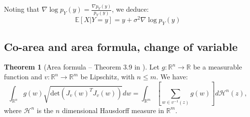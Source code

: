 \documentclass[a4paper,10pt]{article}
\theoremstyle{definition} %
\theoremstyle{definition} %
\theoremstyle{definition} %
\newtheorem{theorem}[definition]{Theorem}
\theoremstyle{definition} %
\newcommand{\R}{\mathbb{R}}
\newcommand{\Normal}[1]{\mathcal{N}\left( {#1} \right)}
\newcommand{\Id}{\mathrm{I}}
\newcommand{\norm}[1]{\left\| #1 \right \|}
\newcommand{\inner}[1]{\left\langle #1 \right\rangle}
\newcommand{\0}{\boldsymbol{0}}
\renewcommand{\H}{\mathcal{H}}
\renewcommand{\det}[1]{\mathrm{det}\left( #1 \right)}
\begin{document}
Noting that $\nabla \log p_Y(y) = \frac{\nabla p_Y(y)}{p_Y(y)}$, we deduce:
\begin{equation*}
\mathbb{E}[X | Y = y] = y + \sigma^2 \nabla \log p_Y(y)
\end{equation*}

\subsection{Co-area and area formula, change of variable}
\begin{theorem}[Area formula -- Theorem 3.9 in \cite{evans2018measure}]
    \label{theorem:area}
    Let $g: \R^n \to \R$ be a measurable function and $v: \R^n \to \R^m$ be Lipschitz, with $n \leqslant m$. We have: 
    \begin{equation*}
        \int_{\R^n} g(w) \sqrt{\det{J_v(w)^T J_v(w)}} dw = \int_{\R^m} \left[ \sum_{w \in v^{-1}(z)} g(w) \right] d\H^{n}(z),
    \end{equation*}
    where $\H^{n}$ is the $n$ dimensional Hausdorff measure in $\R^m$. 
\end{theorem}
\end{document}
